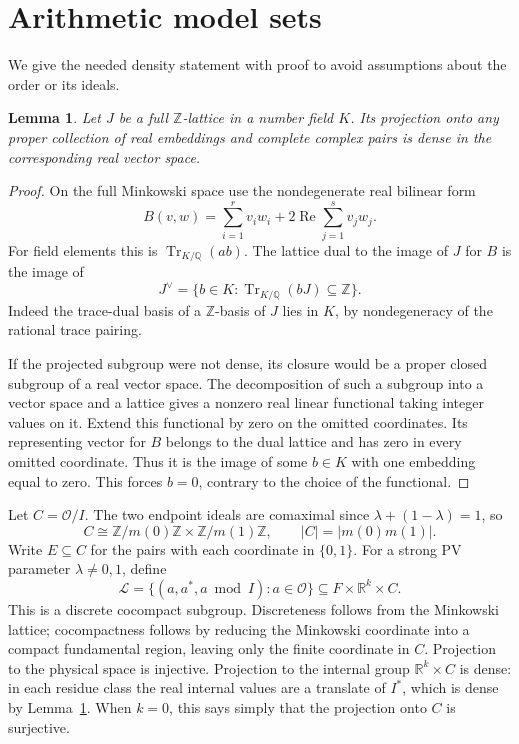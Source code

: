 \documentclass[11pt]{article}
\newtheorem{lemma}[theorem]{Lemma}
\theoremstyle{remark}
\newcommand{\Z}{\mathbb Z}
\newcommand{\Q}{\mathbb Q}
\newcommand{\R}{\mathbb R}
\newcommand{\Oa}{\mathcal O}
\newcommand{\Tr}{\operatorname{Tr}}
\begin{document}
\section{Arithmetic model sets}
We give the needed density statement with proof to avoid assumptions about the order or its ideals.

\begin{lemma}\label{lem:projection}
Let $J$ be a full $\Z$-lattice in a number field $K$. Its projection onto any proper collection of real embeddings and complete complex pairs is dense in the corresponding real vector space.
\end{lemma}
\begin{proof}
On the full Minkowski space use the nondegenerate real bilinear form
\[
 B(v,w)=\sum_{i=1}^r v_iw_i+2\operatorname{Re}\sum_{j=1}^s v_jw_j.
\]
For field elements this is $\Tr_{K/\Q}(ab)$. The lattice dual to the image of $J$ for $B$ is the image of
\[
 J^\vee=\{b\in K:\Tr_{K/\Q}(bJ)\subseteq\Z\}.
\]
Indeed the trace-dual basis of a $\Z$-basis of $J$ lies in $K$, by nondegeneracy of the rational trace pairing.

If the projected subgroup were not dense, its closure would be a proper closed subgroup of a real vector space. The decomposition of such a subgroup into a vector space and a lattice gives a nonzero real linear functional taking integer values on it. Extend this functional by zero on the omitted coordinates. Its representing vector for $B$ belongs to the dual lattice and has zero in every omitted coordinate. Thus it is the image of some $b\in K$ with one embedding equal to zero. This forces $b=0$, contrary to the choice of the functional.
\end{proof}

Let $C=\Oa/I$. The two endpoint ideals are comaximal since $\lambda+(1-\lambda)=1$, so
\begin{equation}\label{eq:crt}
 C\cong\Z/m(0)\Z\times\Z/m(1)\Z,
 \qquad |C|=|m(0)m(1)|.
\end{equation}
Write $E\subseteq C$ for the pairs with each coordinate in $\{0,1\}$. For a strong PV parameter $\lambda\ne0,1$, define
\[
 \mathcal L=\{(a,a^*,a\bmod I):a\in\Oa\}
 \subseteq F\times\R^k\times C.
\]
This is a discrete cocompact subgroup. Discreteness follows from the Minkowski lattice; cocompactness follows by reducing the Minkowski coordinate into a compact fundamental region, leaving only the finite coordinate in $C$. Projection to the physical space is injective. Projection to the internal group $\R^k\times C$ is dense: in each residue class the real internal values are a translate of $I^*$, which is dense by Lemma~\ref{lem:projection}. When $k=0$, this says simply that the projection onto $C$ is surjective.
\end{document}
